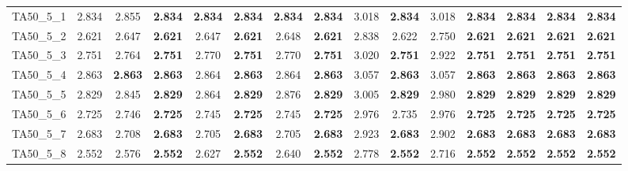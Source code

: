 \begin{tabular}{cc||ccccccccccccc}
TA50\_5\_1         & 2.834            & 2.855            & {\bf 2.834}      & {\bf 2.834}      & {\bf 2.834}      & {\bf 2.834}      & {\bf 2.834}      & 3.018            & {\bf 2.834}      & 3.018            & {\bf 2.834}      & {\bf 2.834}      & {\bf 2.834}      & {\bf 2.834}     \\ 
TA50\_5\_2         & 2.621            & 2.647            & {\bf 2.621}      & 2.647            & {\bf 2.621}      & 2.648            & {\bf 2.621}      & 2.838            & 2.622            & 2.750            & {\bf 2.621}      & {\bf 2.621}      & {\bf 2.621}      & {\bf 2.621}     \\ 
TA50\_5\_3         & 2.751            & 2.764            & {\bf 2.751}      & 2.770            & {\bf 2.751}      & 2.770            & {\bf 2.751}      & 3.020            & {\bf 2.751}      & 2.922            & {\bf 2.751}      & {\bf 2.751}      & {\bf 2.751}      & {\bf 2.751}     \\ 
TA50\_5\_4         & 2.863            & {\bf 2.863}      & {\bf 2.863}      & 2.864            & {\bf 2.863}      & 2.864            & {\bf 2.863}      & 3.057            & {\bf 2.863}      & 3.057            & {\bf 2.863}      & {\bf 2.863}      & {\bf 2.863}      & {\bf 2.863}     \\ 
TA50\_5\_5         & 2.829            & 2.845            & {\bf 2.829}      & 2.864            & {\bf 2.829}      & 2.876            & {\bf 2.829}      & 3.005            & {\bf 2.829}      & 2.980            & {\bf 2.829}      & {\bf 2.829}      & {\bf 2.829}      & {\bf 2.829}     \\ 
TA50\_5\_6         & 2.725            & 2.746            & {\bf 2.725}      & 2.745            & {\bf 2.725}      & 2.745            & {\bf 2.725}      & 2.976            & 2.735            & 2.976            & {\bf 2.725}      & {\bf 2.725}      & {\bf 2.725}      & {\bf 2.725}     \\ 
TA50\_5\_7         & 2.683            & 2.708            & {\bf 2.683}      & 2.705            & {\bf 2.683}      & 2.705            & {\bf 2.683}      & 2.923            & {\bf 2.683}      & 2.902            & {\bf 2.683}      & {\bf 2.683}      & {\bf 2.683}      & {\bf 2.683}     \\ 
TA50\_5\_8         & 2.552            & 2.576            & {\bf 2.552}      & 2.627            & {\bf 2.552}      & 2.640            & {\bf 2.552}      & 2.778            & {\bf 2.552}      & 2.716            & {\bf 2.552}      & {\bf 2.552}      & {\bf 2.552}      & {\bf 2.552}     \\ 

\end{tabular}
